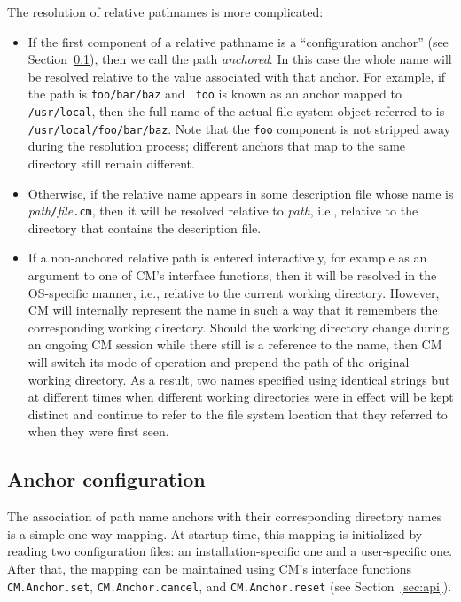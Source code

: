 \documentclass{article}
\begin{document}
The resolution of relative pathnames is more complicated:

\begin{itemize}
\item If the first component of a relative pathname is a
``configuration anchor'' (see Section~\ref{sec:anchors}), then we call
the path {\em anchored}.  In this case the
whole name will be resolved relative to the value associated with that
anchor.  For example, if the path is {\tt foo/bar/baz} and {\tt
foo} is known as an anchor mapped to {\tt /usr/local}, then the
full name of the actual file system object referred to is {\tt
/usr/local/foo/bar/baz}. Note that the {\tt foo} component is not
stripped away during the resolution process; different anchors that
map to the same directory still remain different.
\item Otherwise, if the relative name appears in some description file
whose name is {\it path}{\tt /}{\it file}{\tt .cm}, then it will be
resolved relative to {\it path}, i.e., relative to the directory that
contains the description file.
\item If a non-anchored relative path is entered interactively, for
example as an argument to one of CM's interface functions, then it
will be resolved in the OS-specific manner, i.e., relative to the
current working directory.  However, CM will internally represent the
name in such a way that it remembers the corresponding working
directory.  Should the working directory change during an ongoing CM
session while there still is a reference to the name, then CM will
switch its mode of operation and prepend the path of the original
working directory. As a result, two names specified using identical
strings but at different times when different working directories were
in effect will be kept distinct and continue to refer to the file
system location that they referred to when they were first seen.
\end{itemize}

\subsection{Anchor configuration}
\label{sec:anchors}

The association of path name anchors with their corresponding
directory names is a simple one-way mapping.  At startup time, this
mapping is initialized by reading two configuration files: an
installation-specific one and a user-specific one.  After that, the
mapping can be maintained using CM's interface functions {\tt
CM.Anchor.set}, {\tt CM.Anchor.cancel}, and {\tt CM.Anchor.reset}
(see Section~\ref{sec:api}).
\end{document}
